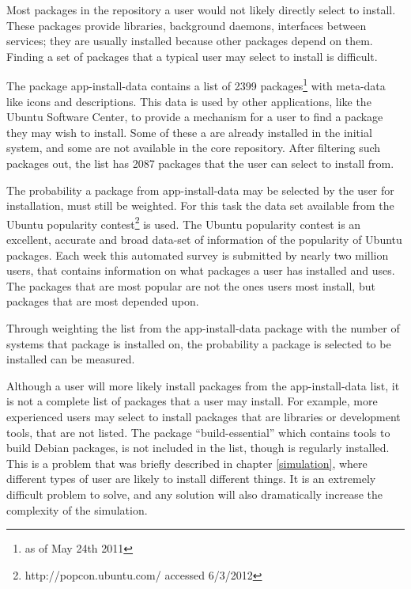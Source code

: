 Most packages in the repository a user would not likely directly select to install.
These packages provide libraries, background daemons, interfaces between services; they are usually installed because other packages depend on them.
Finding a set of packages that a typical user may select to install is difficult.

The package app-install-data contains a list of 2399 packages\footnote{as of May 24th 2011} with meta-data like icons and descriptions.
This data is used by other applications, like the Ubuntu Software Center, to provide a mechanism for a user to find a package they may wish to install.
Some of these a are already installed in the initial system, and some are not available in the core repository.
After filtering such packages out, the list has 2087 packages that the user can select to install from. 

The probability a package from app-install-data may be selected by the user for installation, must still be weighted.
For this task the data set available from the Ubuntu popularity contest\footnote{http://popcon.ubuntu.com/ accessed 6/3/2012} is used.
The Ubuntu popularity contest is an excellent, accurate and broad data-set of information of the popularity of Ubuntu packages.
Each week this automated survey is submitted by nearly two million users, that contains information on what packages a user has installed and uses.
The packages that are most popular are not the ones users most install, but packages that are most depended upon.

Through weighting the list from the app-install-data package with the number of systems that package is installed on,
the probability a package is selected to be installed can be measured.

Although a user will more likely install packages from the app-install-data list, it is not a complete list of packages that a user may install. 
For example, more experienced users may select to install packages that are libraries or development tools, that are not listed.
The package ``build-essential'' which contains tools to build Debian packages, is not included in the list, though is regularly installed.
This is a problem that was briefly described in chapter \ref{simulation}, where different types of user are likely to install different things.
It is an extremely difficult problem to solve, and any solution will also dramatically increase the complexity of the simulation.

